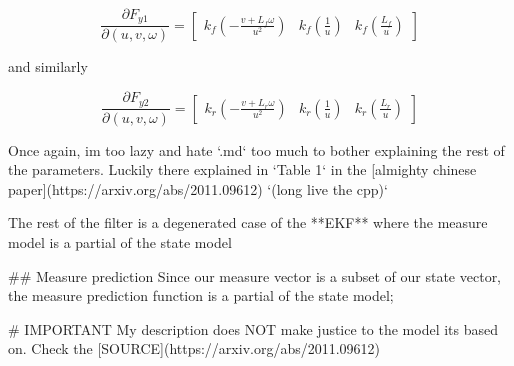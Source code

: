 \[
\frac{\partial F_{y1}}{\partial (u, v, \omega)} =
\begin{bmatrix}
k_f(-\frac{v+L_f\omega}{u^2}) & k_f(\frac{1}{u}) & k_f(\frac{L_f}{u})
\end{bmatrix}
\]

and similarly

\[
\frac{\partial F_{y2}}{\partial (u, v, \omega)} =
\begin{bmatrix}
k_r(-\frac{v+L_r\omega}{u^2}) & k_r(\frac{1}{u}) & k_r(\frac{L_r}{u})
\end{bmatrix}
\]

Once again, im too lazy and hate `.md` too much to bother explaining the rest of the parameters. Luckily there explained in `Table 1` in the [almighty chinese paper](https://arxiv.org/abs/2011.09612) `(long live the cpp)`

The rest of the filter is a degenerated case of the **EKF** where the measure model is a partial of the state model

## Measure prediction
Since our measure vector is a subset of our state vector, the measure prediction function is a partial of the state model;

# IMPORTANT
My description does NOT make justice to the model its based on. Check the [SOURCE](https://arxiv.org/abs/2011.09612)
